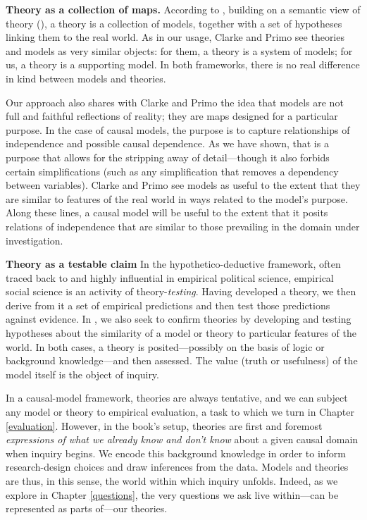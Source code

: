 \documentclass[12pt,]{book}
\begin{document}
\textbf{Theory as a collection of maps.} According to \citet{clarke2012model}, building on a semantic view of theory (\citet{giere2010explaining}), a theory is a collection of models, together with a set of hypotheses linking them to the real world. As in our usage, Clarke and Primo see theories and models as very similar objects: for them, a theory is a system of models; for us, a theory is a supporting model. In both frameworks, there is no real difference in kind between models and theories.

Our approach also shares with Clarke and Primo the idea that models are not full and faithful reflections of reality; they are maps designed for a particular purpose. In the case of causal models, the purpose is to capture relationships of independence and possible causal dependence. As we have shown, that is a purpose that allows for the stripping away of detail---though it also forbids certain simplifications (such as any simplification that removes a dependency between variables). Clarke and Primo see models as useful to the extent that they are similar to features of the real world in ways related to the model's purpose. Along these lines, a causal model will be useful to the extent that it posits relations of independence that are similar to those prevailing in the domain under investigation.

\textbf{Theory as a testable claim} In the hypothetico-deductive framework, often traced back to \citet{popper2014conjectures} and highly influential in empirical political science, empirical social science is an activity of theory-\emph{testing}. Having developed a theory, we then derive from it a set of empirical predictions and then test those predictions against evidence. In \citet{clarke2012model}, we also seek to confirm theories by developing and testing hypotheses about the similarity of a model or theory to particular features of the world. In both cases, a theory is posited---possibly on the basis of logic or background knowledge---and then assessed. The value (truth or usefulness) of the model itself is the object of inquiry.

In a causal-model framework, theories are always tentative, and we can subject any model or theory to empirical evaluation, a task to which we turn in Chapter \ref{evaluation}. However, in the book's setup, theories are first and foremost \emph{expressions of what we already know and don't know} about a given causal domain when inquiry begins. We encode this background knowledge in order to inform research-design choices and draw inferences from the data. Models and theories are thus, in this sense, the world within which inquiry unfolds. Indeed, as we explore in Chapter \ref{questions}, the very questions we ask live within---can be represented as parts of---our theories.
\end{document}
